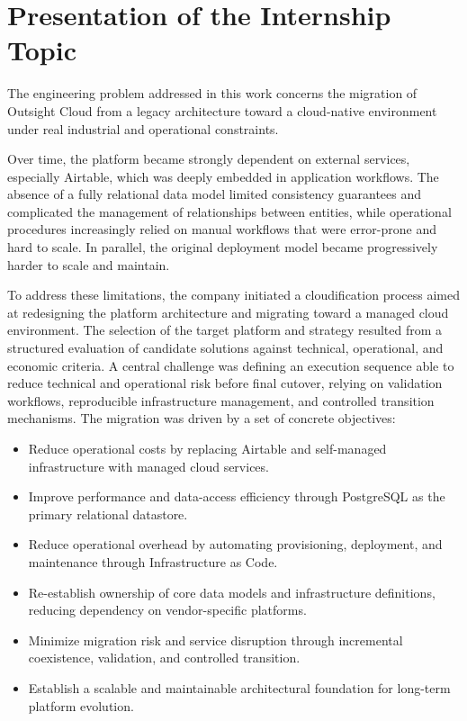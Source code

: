 \chapter{Presentation of the Internship Topic}
\label{chap:internship-topic}

The engineering problem addressed in this work concerns the migration of Outsight Cloud from a legacy architecture toward a cloud-native environment under real industrial and operational constraints.

Over time, the platform became strongly dependent on external services, especially Airtable, which was deeply embedded in application workflows. The absence of a fully relational data model limited consistency guarantees and complicated the management of relationships between entities, while operational procedures increasingly relied on manual workflows that were error-prone and hard to scale. In parallel, the original deployment model became progressively harder to scale and maintain.

To address these limitations, the company initiated a cloudification process aimed at redesigning the platform architecture and migrating toward a managed cloud environment. The selection of the target platform and strategy resulted from a structured evaluation of candidate solutions against technical, operational, and economic criteria. A central challenge was defining an execution sequence able to reduce technical and operational risk before final cutover, relying on validation workflows, reproducible infrastructure management, and controlled transition mechanisms. The migration was driven by a set of concrete objectives:

\begin{itemize}
    \item Reduce operational costs by replacing Airtable and self-managed infrastructure with managed cloud services.
    \item Improve performance and data-access efficiency through PostgreSQL as the primary relational datastore.
    \item Reduce operational overhead by automating provisioning, deployment, and maintenance through Infrastructure as Code.
    \item Re-establish ownership of core data models and infrastructure definitions, reducing dependency on vendor-specific platforms.
    \item Minimize migration risk and service disruption through incremental coexistence, validation, and controlled transition.
    \item Establish a scalable and maintainable architectural foundation for long-term platform evolution.
\end{itemize}
